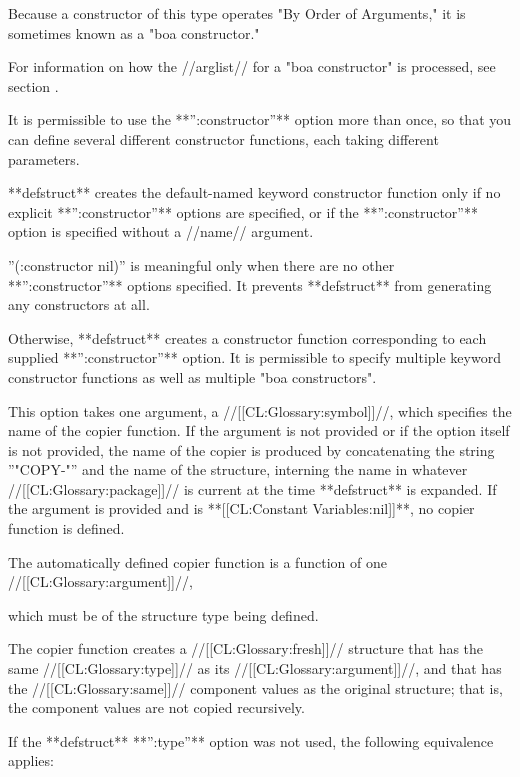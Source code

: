 Because a constructor of this type operates "By Order of Arguments," it is sometimes known as a "boa constructor."

For information on how the //arglist// for a "boa constructor" is processed, see section {\secref\BoaLambdaLists}.

It is permissible to use the **'':constructor''** option more than once, so that you can define several different constructor functions, each taking different parameters.


**defstruct** creates the default-named keyword constructor function only if no explicit **'':constructor''** options are specified, or if the **'':constructor''** option is specified without a //name// argument.

''(:constructor nil)'' is meaningful only when there are no other **'':constructor''** options specified. It prevents **defstruct** from generating any constructors at all.

Otherwise, **defstruct** creates a constructor function corresponding to each supplied **'':constructor''** option. It is permissible to specify multiple keyword constructor functions as well as multiple "boa constructors".


This option takes one argument, a //[[CL:Glossary:symbol]]//, which specifies the name of the copier function. If the argument is not provided or if the option itself is not provided, the name of the copier is produced by concatenating the string ''"COPY-"'' and the name of the structure, interning the name in whatever //[[CL:Glossary:package]]// is current at the time **defstruct** is expanded. If the argument is provided and is **[[CL:Constant Variables:nil]]**, no copier function is defined.

The automatically defined copier function is a function of one //[[CL:Glossary:argument]]//,

which must be of the structure type being defined.

The copier function creates a //[[CL:Glossary:fresh]]// structure that has the same //[[CL:Glossary:type]]// as its //[[CL:Glossary:argument]]//, and that has the //[[CL:Glossary:same]]// component values as the original structure; that is, the component values are not copied recursively.

If the **defstruct** **'':type''** option was not used, the following equivalence applies:

